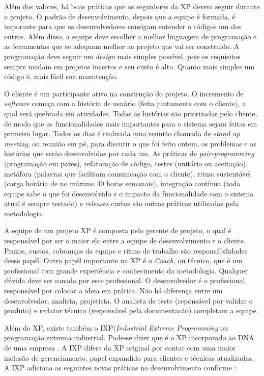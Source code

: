 Além dos valores, há boas práticas que os seguidores da XP devem seguir durante o projeto. O padrão de desenvolvimento, depois que a equipe é formada, é imporante para que os desenvolvedores consigam entender o códigos um dos outros. Além disso, a equipe deve escolher a melhor linguagem de programação e as ferramentas que se adequam melhor ao projeto que vai ser construido. A programação deve seguir um \textit{design} mais simples possível, pois os requisitos sempre mudam em projetos incertos e seu custo é alto. Quanto mais simples um código é, mais fácil sua manutenção. 

O cliente é um participante ativo na construção do projeto. O incremento de \textit{software} começa com a história de usuário (feita juntamente com o cliente), a qual será quebrada em atividades. Todas as histórias são priorizadas pelo cliente, de modo que as funcionalidades mais importantes para o sistema sejam feitas em primeiro lugar. Todos os dias é realizada uma reunião chamada de \textit{stand up meeting}, ou reunião em pé, para discutir o que foi feito ontem, os problemas e as histórias que serão desenvolvidas por cada um. As práticas de \textit{pair-programming} (programação em pares), refatoração de código, testes (unitário ou aceitação), metáfora (palavras que facilitam comunicação com o cliente), ritmo sustentável (carga horária de no máximo 40 horas semanais), integração contínua (toda equipe sabe o que foi desenvolvido e o impacto da funcionalidade com o sistema atual é sempre testado) e \textit{releases} curtos são outras práticas utilizadas pela metodologia.

A equipe de um projeto XP é composta pelo gerente de projeto, o qual é responsável por ser o maior elo entre a equipe de desenvolvimento e o cliente. Prazos, custos, cobranças da equipe e ritmo de trabalho são responsábilidades desse papél. Outro papél importante na XP é o \textit{Coach}, ou técnico, que é um profissional com grande experiência e conhecimento da metodologia. Qualquer dúvida deve ser sanada por esse profissional. O desenvolvedor é o profissional responsável por colocar a ideia em prática. Não há diferença entre um desenvolvedor, analista, projetista. O analista de teste (reponsável por validar o produto) e redator técnico (responsável pela documentacão) completam a equipe.


Além do XP, existe também o IXP(\textit{Industrial Extreme Programming} ou programação extrema industrial. Pode-se dizer que é o XP incorporado ao DNA de uma empresa \cite{ixp:2015}. A IXP difere da XP original por contar com uma maior inclusão de gerenciamento, papel expandido para clientes e técnicas atualizadas. A IXP adiciona as seguintes novas práticas no desenvolvimento conforme :

